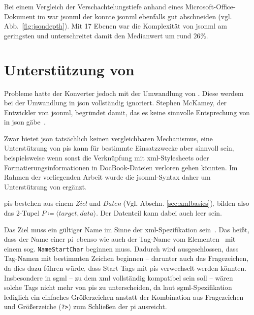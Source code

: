 Bei einem Vergleich der Verschachtelungstiefe anhand eines Microsoft-Office-Dokument im war \acrshort{jsonml} der konnte \acrshort{jsonml} ebenfalls gut abschneiden (vgl. Abb.~\ref{fig:jsondepth}). Mit 17 Ebenen war die Komplexität von \acrshort{jsonml} am geringsten und unterschreitet damit den Medianwert um rund $26\%$.

\section{Unterstützung von }

Probleme hatte der Konverter jedoch mit der Umwandlung von . Diese werdem bei der Umwandlung in \acrshort{json} vollständig ignoriert. Stephen McKamey, der Entwickler von \acrshort{jsonml}, begründet damit, das es keine sinnvolle Entsprechung von  in \acrshort{json} gäbe~\cite{mckamey2006xml}.

Zwar bietet \acrshort{json} tatsächlich keinen vergleichbaren Mechanismus, eine Unterstützung von \glspl{pi} kann für bestimmte Einsatzzwecke aber sinnvoll sein, beispielsweise wenn sonst die Verknüpfung mit \acrshort{xml}-Stylesheets oder Formatierungsinformationen in DocBook-Dateien verloren gehen könnten. Im Rahmen der vorliegenden Arbeit wurde die \acrshort{jsonml}-Syntax daher um Unterstützung von  ergänzt.

\glspl{pi} bestehen aus einem \emph{Ziel} und \emph{Daten} (Vgl. Abschn. \ref{sec:xmlbasics}), bilden also das 2-Tupel $P \coloneqq \langle target, data \rangle$. Der Datenteil kann dabei auch leer sein.

Das Ziel muss ein gültiger Name im Sinne der \acrshort{xml}-Spezifikation sein~\cite[{Regel~[17]}]{maler2008xml}. Das heißt, dass der Name einer \gls{pi}\ ebenso wie auch der Tag-Name vom Elementen~\cite[{Regel~[40]}]{maler2008xml} mit einem sog. \texttt{NameStartChar} beginnen muss. Dadurch wird ausgeschlossen, dass Tag-Namen mit bestimmten Zeichen beginnen -- darunter auch das Fragezeichen, da dies dazu führen würde, dass Start-Tags mit \glspl{pi} verwechselt werden könnten. Insbesondere in \acrshort{sgml} -- zu dem \acrshort{xml} vollständig kompatibel sein soll -- wären solche Tags nicht mehr von \glspl{pi} zu unterscheiden, da laut \acrshort{sgml}-Spezifikation lediglich ein einfaches Größerzeichen anstatt der Kombination aus Fragezeichen und Größerzeiche (\texttt{?>}) zum Schließen der \gls{pi} ausreicht.

